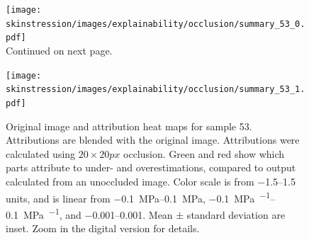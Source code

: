 \begin{figure}
    \ContinuedFloat
    \centering
    \texttt{[image: skinstression/images/explainability/occlusion/summary\_53\_0.pdf]} \\
    \raggedleft Continued on next page.
\end{figure}
\begin{figure}
    \centering
    \texttt{[image: skinstression/images/explainability/occlusion/summary\_53\_1.pdf]}
    \caption[Original image and attribution heat maps for sample 53]{
        Original image and attribution heat maps for sample 53.
        Attributions are blended with the original image.
        Attributions were calculated using $20\times 20\unit{px}$ occlusion.
        Green and red show which parts attribute to under- and overestimations, compared to output calculated from an unoccluded image.
        Color scale is from \numrange{-1.5}{1.5} units, and is linear from \qtyrange{-0.1}{0.1}{\mega\pascal}, \qtyrange{-0.1}{0.1}{\mega\pascal\per\stretch}, and \qtyrange{-0.001}{0.001}{\stretch}.
        Mean $\pm$ standard deviation are inset.
        Zoom in the digital version for details.
    }
    \label{fig:skin_occlusion_53}
\end{figure}

